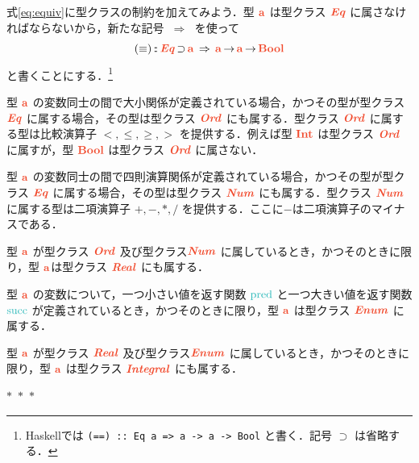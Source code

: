 \documentclass[a5paper,twoside,fleqn,draft]{jsbook}
\def\funcColor{BlueGreen}
\def\typeColor{RedOrange}
\newcommand{\separator}{\begin{center}$*$~$*$~$*$\end{center}}
\newcommand{\programminglanguage}[1]{\textsf{#1}}
\newcommand{\haskell}{\programminglanguage{Haskell}}
\newcommand{\code}[1]{\texttt{#1}}
\DeclareMathOperator{\mSuperClass}{\;\Rightarrow\;}
\DeclareMathOperator{\mSuperSet}{\supset}
\newcommand{\mSpecialFunc}[1]{\textcolor{\funcColor}{\textrm{#1}}}
\DeclareMathOperator{\mPred}{\mSpecialFunc{pred}}
\DeclareMathOperator{\mSucc}{\mSpecialFunc{succ}}
\DeclareMathOperator{\mFuncArrow}{\rightarrow}
\DeclareMathOperator{\mIn}{{:\!:}}
\newcommand{\mType}[1]{\textcolor{\typeColor}{\mathbf{#1}}}
\newcommand{\mA}{\mType{a}}
\newcommand{\mBoolType}{\mType{Bool}}
\newcommand{\mIntType}{\mType{Int}}
\newcommand{\mTypeClass}[1]{\textcolor{\typeColor}{\textbf{\textit{#1}}}}
\newcommand{\mEnumTypeClass}{\mTypeClass{Enum}}
\newcommand{\mEqTypeClass}{\mTypeClass{Eq}}
\newcommand{\mIntegralTypeClass}{\mTypeClass{Integral}}
\newcommand{\mNumTypeClass}{\mTypeClass{Num}}
\newcommand{\mOrdTypeClass}{\mTypeClass{Ord}}
\newcommand{\mRealTypeClass}{\mTypeClass{Real}}
\begin{document}
式\eqref{eq:equiv}に型クラスの制約を加えてみよう．型 $\mA$ は型クラス $\mEqTypeClass$ に属さなければならないから，新たな記号 $\mSuperClass$ を使って
\begin{equation}
  (\equiv)
  \mIn{}\mEqTypeClass\mSuperSet\mA
  \mSuperClass\mA\mFuncArrow\mA\mFuncArrow\mBoolType
\end{equation}
と書くことにする．\footnote{\haskell では \code{(==) :: Eq a => a -> a -> Bool} と書く．記号 $\mSuperSet$ は省略する．}

型 $\mA$ の変数同士の間で大小関係が定義されている場合，かつその型が型クラス $\mEqTypeClass$ に属する場合，その型は型クラス $\mOrdTypeClass$ にも属する．型クラス $\mOrdTypeClass$ に属する型は比較演算子 $<,\le,\ge,>$ を提供する．例えば型 $\mIntType$ は型クラス $\mOrdTypeClass$ に属すが，型 $\mBoolType$ は型クラス $\mOrdTypeClass$ に属さない．

型 $\mA$ の変数同士の間で四則演算関係が定義されている場合，かつその型が型クラス $\mEqTypeClass$ に属する場合，その型は型クラス $\mNumTypeClass$ にも属する．型クラス $\mNumTypeClass$ に属する型は二項演算子 $+,-,*,/$ を提供する．ここに$-$は二項演算子のマイナスである．

型 $\mA$ が型クラス $\mOrdTypeClass$ 及び型クラス$\mNumTypeClass$ に属しているとき，かつそのときに限り，型 $\mA$は型クラス $\mRealTypeClass$ にも属する．

型 $\mA$ の変数について，一つ小さい値を返す関数 $\mPred$ と一つ大きい値を返す関数 $\mSucc$ が定義されているとき，かつそのときに限り，型 $\mA$ は型クラス $\mEnumTypeClass$ に属する．

型 $\mA$ が型クラス $\mRealTypeClass$ 及び型クラス$\mEnumTypeClass$ に属しているとき，かつそのときに限り，型 $\mA$ は型クラス $\mIntegralTypeClass$ にも属する．


\separator
\end{document}
